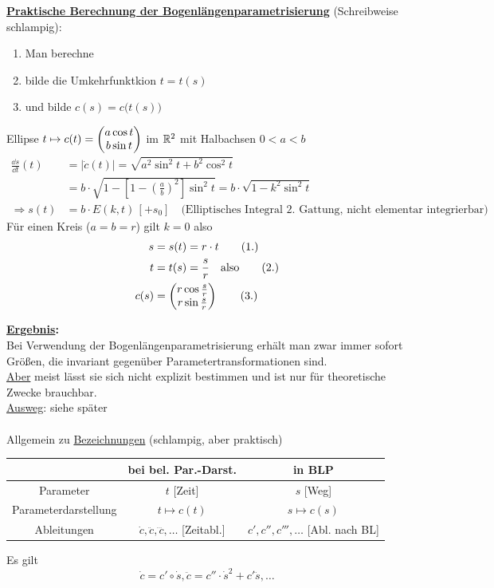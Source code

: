 \textbf{\uline{Praktische Berechnung der Bogenlängenparametrisierung}} (Schreibweise schlampig): 
\begin{enumerate}
 \item Man berechne 
 \item bilde die Umkehrfunktkion \(t=t(s)\)
 \item und bilde \(c(s) = c\big(t(s)\big)\)
\end{enumerate}

\Links

\begin{bsp}
 Ellipse \(t \mapsto c(t) = \begin{pmatrix} a \cos t \\ b \sin t \end{pmatrix} \) im \(\mathbb{R}^2\) mit Halbachsen \(0 < a < b\)
 \begin{align*}
  \frac{\dd s}{\dd t}(t) &= |\dot c(t)| = \sqrt{a^2 \sin^2 t + b^2 \cos^2 t} \\
  &= b \cdot \sqrt{1 - \left[1-\left(\frac ab\right)^2\right] \sin^2 t} = b \cdot \sqrt{1-k^2 \sin^2 t} \\
  \Rightarrow s(t) &= b \cdot E(k,t) \, [+ s_0] \quad \text{(Elliptisches Integral 2. Gattung, nicht elementar integrierbar)}
 \end{align*}
 Für einen Kreis (\(a = b = r\)) gilt \(k = 0\) also
 \begin{align*}
  s &= s(t)=r \cdot t \tag {1.}\\
  t &= t(s) = \frac sr \quad \text{also} \tag {2.}\\
  c(s) &= \begin{pmatrix} r \cos \frac sr \\ r \sin \frac sr \end{pmatrix}  \tag {3.}
 \end{align*}
\end{bsp}

\textbf{\uline{Ergebnis}:} \\
Bei Verwendung der Bogenlängenparametrisierung erhält man zwar immer sofort Größen, die invariant gegenüber Parametertransformationen sind.\\
\uline{Aber} meist lässt sie sich nicht explizit bestimmen und ist nur für theoretische Zwecke brauchbar. \\
\uline{Ausweg}: siehe später \\\\
Allgemein zu \uline{Bezeichnungen} (schlampig, aber praktisch)
\begin{center}
\begin{tabular}{c||c|c}
 & bei bel. Par.-Darst. & in BLP \\
 \hline
 \hline
 Parameter & \(t\) [Zeit] & \(s\) [Weg] \\
 \hline
 Parameterdarstellung & \(t \mapsto c(t)\) & \(s \mapsto c(s)\) \\
 \hline
 Ableitungen & \(\dot c, \ddot c, \dddot c, \dots\) [Zeitabl.] & \(c', c'', c''', \dots\) [Abl. nach BL] 
\end{tabular} 
\end{center}
Es gilt 
\[
 \dot c = c' \circ \dot s, \ddot c = c'' \cdot \dot s^2 + c' \ddot s, \dots
\]

